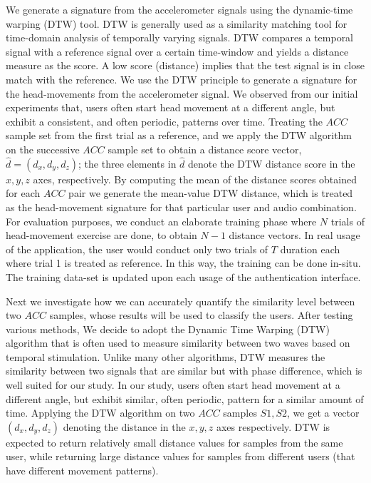 We generate a signature from the accelerometer signals using the
dynamic-time warping (DTW) tool. DTW is generally used
as a similarity matching tool for time-domain analysis of
temporally varying signals.
DTW compares a temporal signal with a reference signal over a certain
time-window and yields a distance measure as the score. A low score (distance)
implies that the test signal is in close match with the reference.
We use the DTW principle to generate a signature for the head-movements
from the accelerometer signal.
We observed from our initial experiments that, users often
start head movement at a different angle,
but exhibit a consistent, and often periodic, patterns over time.
Treating the $ACC$ sample set from the first trial as a reference, and we
apply the DTW algorithm on the successive $ACC$ sample set to obtain a
distance score vector, $\hat{d} = (d_x, d_y, d_z)$; the three elements in
$\hat{d}$ denote the DTW distance score in the $x, y, z$ axes, respectively.
By computing the mean of the distance scores obtained for each $ACC$
pair we generate the mean-value DTW distance, which is treated as the
head-movement signature for that particular user and audio
combination.
For evaluation purposes, we conduct an elaborate training phase where
$N$ trials of head-movement exercise are done, to obtain $N-1$ distance
vectors. In real usage of the application, the user would conduct only
two trials of $T$ duration each where trial 1 is treated as reference.
In this way, the training can be done in-situ. The training data-set is
updated upon each usage of the authentication interface.

\iffalse
Next we investigate how we can accurately quantify the similarity level
between two $ACC$ samples, whose results will be used to classify the users.
After testing various methods,
We decide to adopt the Dynamic Time Warping (DTW) algorithm that is
often used to measure similarity between two waves based on temporal
stimulation.  Unlike many other algorithms, DTW measures the similarity
between two signals that are similar but with phase difference, which is well
suited for our study. In our study, users often start head movement at a
different angle, but exhibit similar, often periodic, pattern for a similar
amount of time. Applying the DTW algorithm on two $ACC$ samples $S1, S2$, we
get a vector $(d_x, d_y, d_z)$ denoting the distance in the $x, y, z$ axes
respectively. DTW is expected to return relatively small distance values for
samples from the same user, while returning large distance values for samples
from different users (that have different movement patterns).

